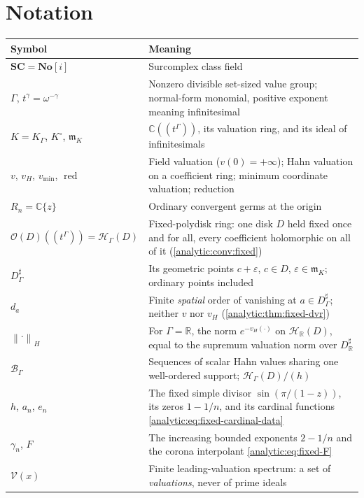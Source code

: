 \documentclass[11pt,letterpaper]{article}
\theoremstyle{definition}
\theoremstyle{remark}
\newcommand{\C}{\mathbb C}
\newcommand{\R}{\mathbb R}
\newcommand{\No}{\mathbf{No}}
\newcommand{\SC}{\mathbf{SC}}
\newcommand{\HH}{\mathcal H}
\newcommand{\BB}{\mathcal B}
\newcommand{\m}{\mathfrak m}
\newcommand{\OO}{\mathcal O}
\newcommand{\norm}[1]{\left\lVert#1\right\rVert}
\newcommand{\red}{\operatorname{red}}
\newcommand{\vH}{v_{\!H}}
\newcommand{\vmin}{v_{\min}}
\numberwithin{equation}{section}
\begin{document}
\section{Notation}\label{analytic:app:notation}

\begin{center}\small
\begin{longtable}{@{}L{0.24\textwidth}L{0.68\textwidth}@{}}
\toprule
Symbol & Meaning\\
\midrule
\endhead
$\SC=\No[i]$ & Surcomplex class field\\[0.3em]
$\Gamma$, $t^\gamma=\omega^{-\gamma}$ & Nonzero divisible set-sized value
group; normal-form monomial, positive exponent meaning infinitesimal\\[0.3em]
$K=K_\Gamma$, $K^\circ$, $\m_K$ & $\C((t^\Gamma))$, its valuation ring, and
its ideal of infinitesimals\\[0.3em]
$v$, $\vH$, $\vmin$, $\red$ & Field valuation ($v(0)=+\infty$); Hahn
valuation on a coefficient ring; minimum coordinate valuation;
reduction\\[0.3em]
$R_n=\C\{z\}$ & Ordinary convergent germs at the origin\\[0.3em]
$\OO(D)((t^\Gamma))=\HH_\Gamma(D)$ & Fixed-polydisk ring: one disk $D$ held
fixed once and for all, every coefficient holomorphic on all of it
(\cref{analytic:conv:fixed})\\[0.3em]
$D^\sharp_\Gamma$ & Its geometric points $c+\varepsilon$, $c\in D$,
$\varepsilon\in\m_K$; ordinary points included\\[0.3em]
$d_a$ & Finite \emph{spatial} order of vanishing at $a\in D^\sharp_\Gamma$;
neither $v$ nor $\vH$ (\cref{analytic:thm:fixed-dvr})\\[0.3em]
$\norm{\cdot}_H$ & For $\Gamma=\R$, the norm $e^{-\vH(\cdot)}$ on
$\HH_\R(D)$, equal to the supremum valuation norm over
$D^\sharp_\R$\\[0.3em]
$\BB_\Gamma$ & Sequences of scalar Hahn values sharing one well-ordered
support; $\HH_\Gamma(D)/(h)$\\[0.3em]
$h$, $a_n$, $e_n$ & The fixed simple divisor $\sin(\pi/(1-z))$, its zeros
$1-1/n$, and its cardinal functions
\eqref{analytic:eq:fixed-cardinal-data}\\[0.3em]
$\gamma_n$, $F$ & The increasing bounded exponents $2-1/n$ and the corona
interpolant \eqref{analytic:eq:fixed-F}\\[0.3em]
$\mathcal V(x)$ & Finite leading-valuation spectrum: a set of
\emph{valuations}, never of prime ideals\\[0.3em]

\end{longtable}
\end{center}
\end{document}
